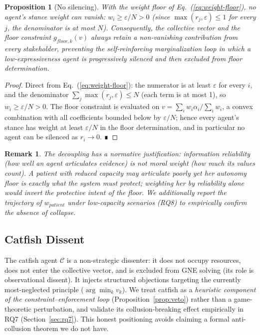 \documentclass[11pt]{article}
\newtheorem{proposition}[theorem]{Proposition}
\newtheorem{remark}[theorem]{Remark}
\begin{document}
\begin{proposition}[No silencing]
\label{prop:silencing}
With the weight floor of Eq.~(\ref{eq:weight-floor}), no agent's stance
weight can vanish: $w_i \ge \varepsilon / N > 0$ (since
$\max(r_j,\varepsilon) \le 1$ for every $j$, the denominator is at most $N$).
Consequently, the collective vector and the floor constraint
$g_{floor,k}(v)$ always retain a non-vanishing contribution from every
stakeholder, preventing the self-reinforcing marginalization loop in which a
low-expressiveness agent is progressively silenced and then excluded from
floor determination.
\end{proposition}
\begin{proof}
Direct from Eq.~(\ref{eq:weight-floor}): the numerator is at least
$\varepsilon$ for every $i$, and the denominator
$\sum_j \max(r_j,\varepsilon) \le N$ (each term is at most 1), so
$w_i \ge \varepsilon / N > 0$. The floor constraint is evaluated on
$v=\sum_i w_i\alpha_i/\sum_i w_i$, a convex combination with all coefficients
bounded below by $\varepsilon/N$; hence every agent's stance has weight at
least $\varepsilon/N$ in the floor determination, and in particular no agent
can be silenced as $r_i \to 0$. ∎
\end{proof}

\begin{remark}
The decoupling has a normative justification: information reliability
(how well an agent articulates evidence) is not moral weight (how much its
values count). A patient with reduced capacity may articulate poorly yet her
autonomy floor is exactly what the system must protect; weighting her by
reliability alone would invert the protective intent of the floor. We
additionally report the trajectory of $w_{patient}$ under low-capacity
scenarios (RQ8) to empirically confirm the absence of collapse.
\end{remark}

\subsection{Catfish Dissent}
\label{sec:catfish}
The catfish agent $\mathcal{C}$ is a non-strategic dissenter: it does not
occupy resources, does not enter the collective vector, and is excluded from
GNE solving (its role is observational dissent). It injects structured
objections targeting the currently most-neglected principle
($\arg\min_k v_k$). We treat catfish as a \emph{heuristic component of the
constraint--enforcement loop} (Proposition~\ref{prop:veto}) rather than a
game-theoretic perturbation, and validate its collusion-breaking effect
empirically in RQ7 (Section~\ref{sec:rq7}). This honest positioning avoids
claiming a formal anti-collusion theorem we do not have.
\end{document}
